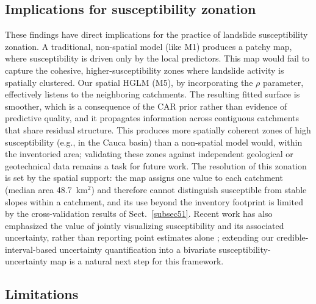 \documentclass[journal abbreviation, manuscript]{copernicus}
\newcommand{\hl}[1]{#1}
\newcommand{\hlG}[1]{#1}
\newcommand{\hlE}[1]{#1}
\begin{document}
\subsection{Implications for susceptibility zonation}\label{subsec53}

These findings have direct implications for the practice of landslide susceptibility zonation. 
A traditional, non-spatial model (like M1) produces a patchy map, where susceptibility is driven only by the local predictors. 
This map would fail to capture the cohesive, higher-susceptibility zones \hlE{where landslide activity is spatially clustered}. 
Our spatial HGLM (M5), by incorporating the $\rho$ parameter, effectively listens to the neighboring catchments. 
\hlE{The resulting fitted surface is smoother, which is a consequence of the CAR prior rather than evidence of predictive quality, and it propagates information across contiguous catchments that share residual structure.} 
\hl{This produces more spatially coherent zones of high susceptibility (e.g., in the Cauca basin) than a non-spatial model would}\hlE{, within the inventoried area;} \hl{validating these zones against independent geological or geotechnical data remains a task for future work.} \hlE{The resolution of this zonation is set by the spatial support: the map assigns one value to each catchment (median area 48.7~km$^2$) and therefore cannot distinguish susceptible from stable slopes within a catchment, and its use beyond the inventory footprint is limited by the cross-validation results of \mbox{Sect.~\ref{subsec51}}.} 
\hlG{Recent work has also emphasized the value of jointly visualizing susceptibility and its associated uncertainty, rather than reporting point estimates alone }\citep{schlogl2025visualizing}\hlG{; extending our credible-interval-based uncertainty quantification into a bivariate susceptibility-uncertainty map is a natural next step for this framework.}

\subsection{\hl{Limitations}}\label{subsec54}
\end{document}
